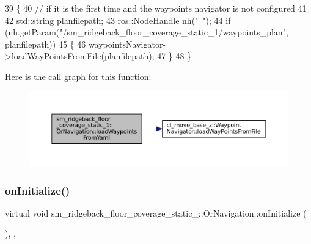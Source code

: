 \begin{DoxyCode}
39     \{
40         \textcolor{comment}{// if it is the first time and the waypoints navigator is not configured}
41 
42         std::string planfilepath;
43         ros::NodeHandle nh(\textcolor{stringliteral}{"~"});
44         \textcolor{keywordflow}{if} (nh.getParam(\textcolor{stringliteral}{"/sm\_ridgeback\_floor\_coverage\_static\_1/waypoints\_plan"}, planfilepath))
45         \{
46             waypointsNavigator->\hyperlink{classcl__move__base__z_1_1WaypointNavigator_a18d74467ddf0e637a8d5a6e1fa2e93db}{loadWayPointsFromFile}(planfilepath);
47         \}
48     \}
\end{DoxyCode}
Here is the call graph for this function\+:
\nopagebreak
\begin{figure}[H]
\begin{center}
\leavevmode
\includegraphics[width=350pt]{classsm__ridgeback__floor__coverage__static__1_1_1OrNavigation_a32f658f3d1ed7724f13fd30eb2139bbb_cgraph}
\end{center}
\end{figure}
\mbox{\label{classsm__ridgeback__floor__coverage__static__1_1_1OrNavigation_a1bb3bffac822d76afd68dfce4d93cadc}} 
\subsubsection{\texorpdfstring{on\+Initialize()}{onInitialize()}}
{\footnotesize\ttfamily virtual void sm\+\_\+ridgeback\+\_\+floor\+\_\+coverage\+\_\+static\+\_\+::\+Or\+Navigation\+::on\+Initialize (\begin{DoxyParamCaption}{ }\end{DoxyParamCaption})\hspace{0.3cm}{\ttfamily [inline]}, {\ttfamily [override]}, {\ttfamily [virtual]}}



